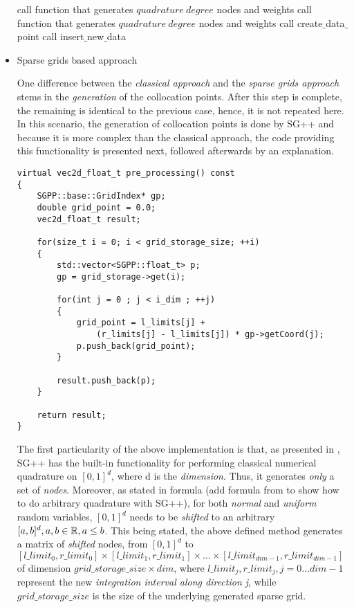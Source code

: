 \begin{itemize}
\begin{algorithm}
\begin{algorithmic}[1]
    		\State call function that generates $quadrature \ degree$ nodes and weights
    	 	    		\State call function that generates $quadrature \ degree$ nodes and weights
    	 	 \EndFor
    	\EndIf
        \State call create$\_$data$\_$point 
        \State call insert$\_$new$\_$data 
    \EndFor
  \end{algorithmic}
\end{algorithm}
\item Sparse grids based approach 

	One difference between the \emph{classical approach} and the \emph{sparse grids approach} stems in the \emph{generation} of the collocation points. After this step is complete, the remaining is identical to the previous case, hence, it is not repeated here. In this scenario, the generation of collocation points is done by SG++ and because it is more complex than the classical approach, the code providing this functionality is presented next, followed afterwards by an explanation.
\begin{lstlisting}
virtual vec2d_float_t pre_processing() const
{
	SGPP::base::GridIndex* gp;
	double grid_point = 0.0;
	vec2d_float_t result;

	for(size_t i = 0; i < grid_storage_size; ++i) 
	{
		std::vector<SGPP::float_t> p;
		gp = grid_storage->get(i);
			
		for(int j = 0 ; j < i_dim ; ++j)
		{
			grid_point = l_limits[j] + 
				(r_limits[j] - l_limits[j]) * gp->getCoord(j);
			p.push_back(grid_point);
		}

		result.push_back(p);
	}

	return result;
}
\end{lstlisting}
	The first particularity of the above implementation is that, as presented in , SG++ has the built-in functionality for performing classical numerical quadrature on $[0, 1]^d$, where d is the \emph{dimension}. Thus, it generates \emph{only} a set of \emph{nodes}. Moreover, as stated in formula (add formula from  to show how to do arbitrary quadrature with SG++), for both \emph{normal} and \emph{uniform} random variables, $[0, 1]^d$ needs to be \emph{shifted} to an arbitrary $[a, b]^d, a, b \in \mathbb{R}, a \leq b$. This being stated, the above defined method generates a matrix of \emph{shifted} nodes, from $[0,1]^d$ to $[l\_limit_0, r\_limit_0] \times [l\_limit_1, r\_limit_1] \times \ldots \times [l\_limit_{dim-1}, r\_limit_{dim-1}]$ of dimension $grid\_storage\_size \times dim$, where $l\_limit_j, r\_limit_j, j = 0 \ldots dim-1$ represent the new \emph{integration interval along direction j}, while $grid\_storage\_size$ is the size of the underlying generated sparse grid.
\end{itemize}

